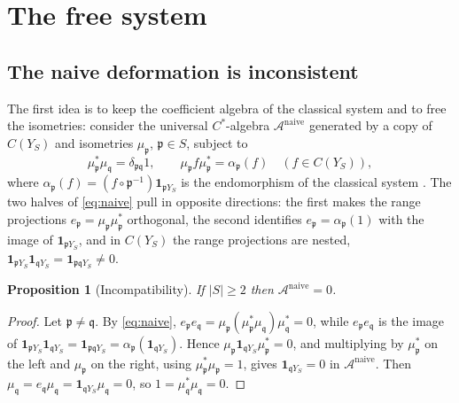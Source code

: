 \documentclass[11pt]{amsart}
\numberwithin{equation}{section}
\newtheorem{proposition}[theorem]{Proposition}
\theoremstyle{definition}
\theoremstyle{remark}
\newcommand{\cA}{\mathcal{A}}
\newcommand{\pp}{\mathfrak{p}}
\newcommand{\qq}{\mathfrak{q}}
\begin{document}
\maketitle

\tableofcontents

\section{The free system}

\subsection{The naive deformation is inconsistent}

The first idea is to keep the coefficient algebra of the classical system and to free the
isometries: consider the universal $C^*$-algebra $\cA^{\mathrm{naive}}$ generated by a copy
of $C(Y_S)$ and isometries $\mu_\pp$, $\pp\in S$, subject to
\begin{equation}\label{eq:naive}
\mu_\pp^*\mu_\qq=\delta_{\pp\qq}1,\qquad \mu_\pp f\mu_\pp^*=\alpha_\pp(f)\quad(f\in C(Y_S)),
\end{equation}
where $\alpha_\pp(f)=(f\circ\pp^{-1})\mathbf 1_{\pp Y_S}$ is the endomorphism of the
classical system \cite[\S2]{Main}. The two halves of \eqref{eq:naive} pull in opposite
directions: the first makes the range projections $e_\pp=\mu_\pp\mu_\pp^*$ orthogonal, the
second identifies $e_\pp=\alpha_\pp(1)$ with the image of $\mathbf 1_{\pp Y_S}$, and in
$C(Y_S)$ the range projections are nested, $\mathbf 1_{\pp Y_S}\mathbf 1_{\qq Y_S}=\mathbf 1_{\pp\qq Y_S}\ne0$.

\begin{proposition}[Incompatibility]\label{prop:naive}
If $|S|\ge2$ then $\cA^{\mathrm{naive}}=0$.
\end{proposition}

\begin{proof}
Let $\pp\ne\qq$. By \eqref{eq:naive}, $e_\pp e_\qq=\mu_\pp(\mu_\pp^*\mu_\qq)\mu_\qq^*=0$,
while $e_\pp e_\qq$ is the image of $\mathbf 1_{\pp Y_S}\mathbf 1_{\qq Y_S}=\mathbf 1_{\pp\qq Y_S}=\alpha_\pp(\mathbf 1_{\qq Y_S})$.
Hence $\mu_\pp\mathbf 1_{\qq Y_S}\mu_\pp^*=0$, and multiplying by $\mu_\pp^*$ on the left and
$\mu_\pp$ on the right, using $\mu_\pp^*\mu_\pp=1$, gives $\mathbf 1_{\qq Y_S}=0$ in
$\cA^{\mathrm{naive}}$. Then $\mu_\qq=e_\qq\mu_\qq=\mathbf 1_{\qq Y_S}\mu_\qq=0$, so
$1=\mu_\qq^*\mu_\qq=0$.
\end{proof}
\end{document}
